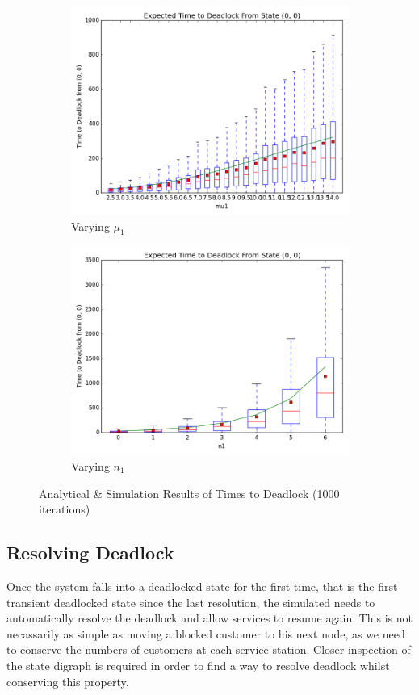 \documentclass{article}
\begin{document}
\begin{figure}[H]
\begin{subfigure}[b]{0.5\textwidth}
  \includegraphics[width=\textwidth]{images/varymu1}
  \caption{Varying $\mu_1$}
  \label{fig:timestodeadlock2_mu1}
\end{subfigure}
\begin{subfigure}[b]{0.5\textwidth}
  \includegraphics[width=\textwidth]{images/varyn1}
  \caption{Varying $n_1$}
  \label{fig:timestodeadlock2_n1}
\end{subfigure}
\caption{Analytical \& Simulation Results of Times to Deadlock (1000 iterations)}
\label{fig:timestodeadlock2}
\end{figure}


\subsection{Resolving Deadlock}
Once the system falls into a deadlocked state for the first time, that is the first transient deadlocked state since the last resolution, the simulated needs to automatically resolve the deadlock and allow services to resume again.
This is not necassarily as simple as moving a blocked customer to his next node, as we need to conserve the numbers of customers at each service station.
Closer inspection of the state digraph is required in order to find a way to resolve deadlock whilst conserving this property.
\end{document}
